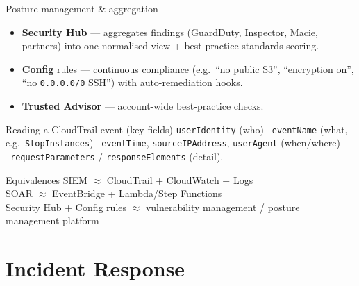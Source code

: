 \documentclass[aspectratio=169,10pt]{beamer}
\newcommand{\svc}[1]{{\color{accent}\textsf{\textbf{#1}}}}      %
\begin{document}
\begin{frame}{Posture management \& aggregation}
  \footnotesize
  \begin{itemize}
    \item \svc{Security Hub} --- aggregates findings (GuardDuty, Inspector, Macie, partners) into
          one normalised view + best-practice standards scoring.
    \item \svc{Config} rules --- continuous compliance (e.g.\ ``no public S3'', ``encryption on'',
          ``no \texttt{0.0.0.0/0} SSH'') with auto-remediation hooks.
    \item \svc{Trusted Advisor} --- account-wide best-practice checks.
  \end{itemize}
  \vfill
  \begin{exampleblock}{\footnotesize Reading a CloudTrail event (key fields)}
    \scriptsize \texttt{userIdentity} (who) \textbullet\ \texttt{eventName} (what, e.g.\ \texttt{StopInstances})
    \textbullet\ \texttt{eventTime}, \texttt{sourceIPAddress}, \texttt{userAgent} (when/where)
    \textbullet\ \texttt{requestParameters} / \texttt{responseElements} (detail).
  \end{exampleblock}
  \begin{block}{\footnotesize Equivalences}
    \footnotesize SIEM $\approx$ CloudTrail + CloudWatch + Logs\\
    \footnotesize SOAR $\approx$ EventBridge + Lambda/Step Functions \\
    \footnotesize Security Hub + Config rules $\approx$ vulnerability management / posture management platform
  \end{block}
\end{frame}

\section{Incident Response}
\end{document}
